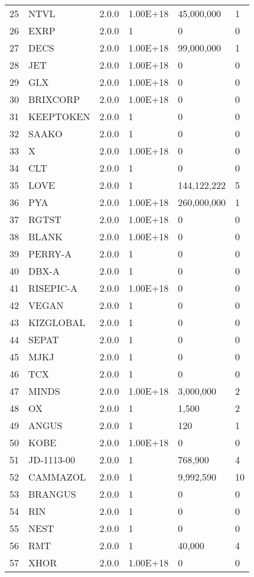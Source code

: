 \begin{longtable}{llllll}
25 & NTVL & 2.0.0 & 1.00E+18 & 45,000,000 & 1 \\
26 & EXRP & 2.0.0 & 1 & 0 & 0 \\
27 & DECS & 2.0.0 & 1.00E+18 & 99,000,000 & 1 \\
28 & JET & 2.0.0 & 1.00E+18 & 0 & 0 \\
29 & GLX & 2.0.0 & 1.00E+18 & 0 & 0 \\
30 & BRIXCORP & 2.0.0 & 1.00E+18 & 0 & 0 \\
31 & KEEPTOKEN & 2.0.0 & 1 & 0 & 0 \\
32 & SAAKO & 2.0.0 & 1 & 0 & 0 \\
33 & X & 2.0.0 & 1.00E+18 & 0 & 0 \\
34 & CLT & 2.0.0 & 1 & 0 & 0 \\
35 & LOVE & 2.0.0 & 1 & 144,122,222 & 5 \\
36 & PYA & 2.0.0 & 1.00E+18 & 260,000,000 & 1 \\
37 & RGTST & 2.0.0 & 1.00E+18 & 0 & 0 \\
38 & BLANK & 2.0.0 & 1.00E+18 & 0 & 0 \\
39 & PERRY-A & 2.0.0 & 1 & 0 & 0 \\
40 & DBX-A & 2.0.0 & 1 & 0 & 0 \\
41 & RISEPIC-A & 2.0.0 & 1.00E+18 & 0 & 0 \\
42 & VEGAN & 2.0.0 & 1 & 0 & 0 \\
43 & KIZGLOBAL & 2.0.0 & 1 & 0 & 0 \\
44 & SEPAT & 2.0.0 & 1 & 0 & 0 \\
45 & MJKJ & 2.0.0 & 1 & 0 & 0 \\
46 & TCX & 2.0.0 & 1 & 0 & 0 \\
47 & MINDS & 2.0.0 & 1.00E+18 & 3,000,000 & 2 \\
48 & OX & 2.0.0 & 1 & 1,500 & 2 \\
49 & ANGUS & 2.0.0 & 1 & 120 & 1 \\
50 & KOBE & 2.0.0 & 1.00E+18 & 0 & 0 \\
51 & JD-1113-00 & 2.0.0 & 1 & 768,900 & 4 \\
52 & CAMMAZOL & 2.0.0 & 1 & 9,992,590 & 10 \\
53 & BRANGUS & 2.0.0 & 1 & 0 & 0 \\
54 & RIN & 2.0.0 & 1 & 0 & 0 \\
55 & NEST & 2.0.0 & 1 & 0 & 0 \\
56 & RMT & 2.0.0 & 1 & 40,000 & 4 \\
57 & XHOR & 2.0.0 & 1.00E+18 & 0 & 0 \\

\end{longtable}
